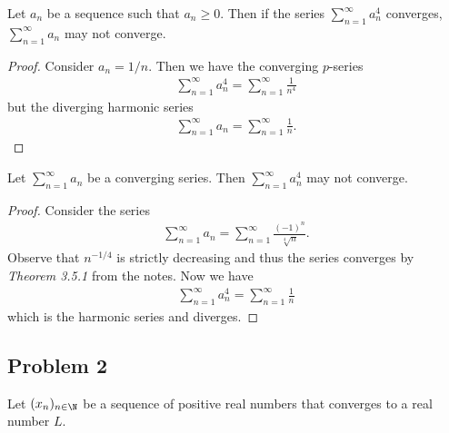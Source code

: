 \documentclass{article}
\begin{document}
\begin{claim}
    Let $a_n$ be a sequence such that $a_n\geq 0$. Then if the series
    $\sum_{n=1}^\infty a_n^4$ converges, $\sum_{n=1}^\infty a_n$ may
    not converge.
\end{claim}

\begin{proof}
    Consider $a_n = 1/n$. Then we have the converging $p$-series
    \begin{align*}
        \sum_{n=1}^\infty a_n^4 = \sum_{n=1}^\infty \frac{1}{n^4}
    \end{align*}
    but the diverging harmonic series
    \begin{align*}
        \sum_{n=1}^\infty a_n = \sum_{n=1}^\infty \frac{1}{n}.
    \end{align*}
\end{proof}

\begin{claim}
    Let $\sum_{n=1}^\infty a_n$ be a converging series. Then
    $\sum_{n=1}^\infty a_n^4$ may not converge.
\end{claim}

\begin{proof}
    Consider the series
    \begin{align*}
        \sum_{n=1}^\infty a_n = \sum_{n=1}^\infty \frac{(-1)^n}{\sqrt[4]{n}}.
    \end{align*}
    Observe that $n^{-1/4}$ is strictly decreasing and thus the series converges
    by \emph{Theorem 3.5.1} from the notes. Now we have
    \begin{align*}
        \sum_{n=1}^\infty a_n^4 = \sum_{n=1}^\infty \frac{1}{n}
    \end{align*}
    which is the harmonic series and diverges.
\end{proof}

\subsection*{Problem 2}

Let $(x_n)_{n\in\N}$ be a sequence of positive real
numbers that converges to a real number $L$.
\end{document}
